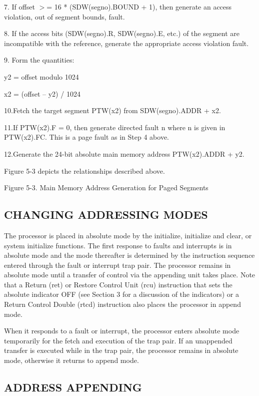 7. If offset $>$= 16 * (SDW(segno).BOUND + 1), then generate an access
violation, out of segment bounds, fault.

8. If the access bits (SDW(segno).R, SDW(segno).E, etc.) of the segment are
incompatible with the reference, generate the appropriate access violation
fault.

9. Form the quantities:

y2 = offset modulo 1024

x2 = (offset -- y2) / 1024

10.Fetch the target segment PTW(x2) from SDW(segno).ADDR + x2.


11.If PTW(x2).F = 0, then generate directed fault n where n is given in
PTW(x2).FC. This is a page fault as in Step 4 above.


12.Generate the 24-bit absolute main memory address PTW(x2).ADDR + y2.


Figure 5-3 depicts the relationships described above.


Figure 5-3. Main Memory Address Generation for Paged Segments

\subsection{CHANGING ADDRESSING MODES}

The processor is placed in absolute mode by the initialize, initialize and
clear, or system initialize functions. The first response to faults and
interrupts is in absolute mode and the mode thereafter is determined by the
instruction sequence entered through the fault or interrupt trap pair. The
processor remains in absolute mode until a transfer of control via the
appending unit takes place. Note that a Return (ret) or Restore Control Unit
(rcu) instruction that sets the absolute indicator OFF (see Section 3 for a
discussion of the indicators) or a Return Control Double (rtcd) instruction
also places the processor in append mode.  

When it responds to a fault or interrupt, the processor enters absolute mode
temporarily for the fetch and execution of the trap pair. If an unappended
transfer is executed while in the trap pair, the processor remains in absolute
mode, otherwise it returns to append mode.

\subsection{ADDRESS APPENDING}

